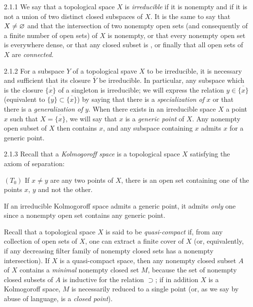 
\begin{env}{2.1.1}
We say that a topological space $X$ is \emph{irreducible} if it is nonempty and
if it is not a union of two distinct closed subspaces of $X$. It is the same to say
that $X\neq\varnothing$ and that the intersection of two nonempty open sets (and consequently
of a finite number of open sets) of $X$ is nonempty, or that every nonempty open set
is everywhere dense, or that any closed subset is , or finally
that all open sets of $X$ are \emph{connected}.
\end{env}

\begin{env}{2.1.2}
For a subspace $Y$ of a topological spave $X$ to be irreducible, it is necessary and
sufficient that its closure $\overline{Y}$ be irreducible. In particular, any subspace
which is the closure $\overline{\{x\}}$ of a singleton is irreducible;
we will express the relation $y\in\overline{\{x\}}$ (equivalent to
$\overline{\{y\}}\subset\overline{\{x\}}$) by saying that there is a \emph{specialization of}
$x$ or that there is a \emph{generalization of} $y$. When there exists in an irreducible
space $X$ a point $x$ such that $X=\overline{\{x\}}$, we will say that $x$ is a
\emph{generic point} of $X$. Any nonempty open subset of $X$ then contains $x$, and any
subspace containing $x$ admits $x$ for a generic point.
\end{env}

\begin{env}{2.1.3}
Recall that a \emph{Kolmogoroff space} is a topological space $X$ satisfying the axiom
of separation:

$(T_0)$ If $x\neq y$ are any two points of $X$, there is an open set containing one of
the points $x$, $y$ and not the other.

If an irreducible Kolmogoroff space admits a generic point, it admits \emph{only} one
since a nonempty open set contains any generic point.

Recall that a topological space $X$ is said to be \emph{quasi-compact} if, from any
collection of open sets of $X$, one can extract a finite cover of $X$ (or, equivalently,
if any decreasing filter family of nonempty closed sets has a nonempty intersection). If
$X$ is a quasi-compact space, then any nonempty closed subset $A$ of $X$ contains a \emph{minimal}
nonempty closed set $M$, because the set of nonempty closed subsets of $A$ is inductive for
the relation $\supset$; if in addition $X$ is a Kolmogoroff space, $M$ is necessarily reduced
to a single point (or, as we say by abuse of language, is a \emph{closed point}).
\end{env}

